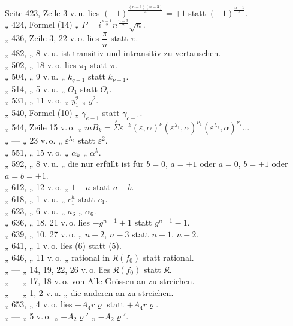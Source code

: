 \begin{flushleft}
Seite 423, Zeile 3 v.\,u. lies $(-1)^{\frac{(n-1)(n-3)}{4}}=+1$ statt $(-1)^{\frac{n-1}{2}}$. \\
„ 424, Formel (14) „ $P=i^{\frac{n-1}{2}}n^{\frac{n-3}{2}}\sqrt{n}$. \\
„ 436, Zeile 3, 22 v.\,o. lies $\dfrac{\pi}{n}$ statt $\pi$. \\
„ 482, „ 8 v.\,u. ist transitiv und intransitiv zu vertauschen. \\
„ 502, „ 18 v.\,o. lies $\pi_1$ statt $\pi$. \\
„ 504, „ 9 v.\,u. „ $k_{q-1}$ statt $k_{\nu-1}$. \\
„ 514, „ 5 v.\,u. „ $\Theta_1$ statt $\Theta_i$. \\
„ 531, „ 11 v.\,o. „ $y_1^2$ „ $y^2$. \\
„ 540, Formel (10) „ $\gamma_{e-1}$ statt $\gamma_{c-1}$. \\
„ 544, Zeile 15 v.\,o. „ $mB_k=\overset{\varepsilon}{\Sigma}\varepsilon^{-k}(\varepsilon,\alpha)^\nu
(\varepsilon^{\lambda_1},\alpha)^{\nu_1}(\varepsilon^{\lambda_2},\alpha)^{\nu_2}\ldots$ \\
„ — „ 23 v.\,o. „ $\varepsilon^{\lambda_2}$ statt $\varepsilon^2$. \\
„ 551, „ 15 v.\,o. „ $\alpha_k$ „ $\alpha^k$. \\
„ 592, „ 8 v.\,u. „ die nur erf\"ullt ist f\"ur $b=0$, $a=\pm 1$ oder
$a=0$, $b=\pm 1$ oder $a=b=\pm 1$. \\
„ 612, „ 12 v.\,o. „ $1-a$ statt $a-b$. \\
„ 618, „ 1 v.\,u. „ $c_1^h$ statt $c_1$. \\
„ 623, „ 6 v.\,u. „ $a_6$ „ $\alpha_6$.
\\
„ 636, „ 18, 21 v.\,o. lies $-g^{n-1}+1$ statt $g^{n-1}-1$. \\
„ 639, „ 10, 27 v.\,o. „ $n-2$, $n-3$ statt $n-1$, $n-2$. \\
„ 641, „ 1 v.\,o. lies (6) statt (5). \\
„ 646, „ 11 v.\,o. „ rational in $\mathfrak{K}(f_0)$ statt rational. \\
„ — „ 14, 19, 22, 26 v.\,o. lies $\mathfrak{K}(f_0)$ statt $\mathfrak{K}$. \\
„ — „ 17, 18 v.\,o. von \glqq{}Alle Gr\"ossen\grqq{} an zu streichen. \\
„ — „ 1, 2 v.\,u. „ \glqq{}die anderen\grqq{} an zu streichen. \\
„ 653, „ 4 v.\,o. lies $-A_4 r\varrho$ statt $+A_4 r\varrho$. \\
„ — „ 5 v.\,o. „ $+A_2\varrho'$ „ $-A_2\varrho'$.
\end{flushleft}

